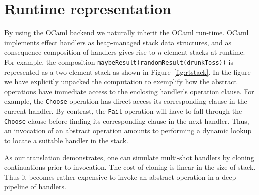 \documentclass[12pt,mscres,cdtppar,twoside,openright,logo,rightchapter,normalheadings]{infthesis}
\theoremstyle{definition}
\begin{document}
\section{Runtime representation}
\label{sec:representation}
By using the OCaml backend we naturally inherit the OCaml
run-time. OCaml implements effect handlers as heap-managed stack data
structures, and as consequence composition of handlers gives rise to
$n$-element stacks at runtime. For example, the composition
\lstinline[mathescape]!maybeResult(randomResult(drunkToss))! is
represented as a two-element stack as shown in
Figure~\ref{fig:rtstack}. In the figure we have explicitly unpacked
the computation to exemplify how the abstract operations have
immediate access to the enclosing handler's operation clause. For
example, the \lstinline$Choose$ operation has direct access its
corresponding clause in the current handler. By contrast, the
\lstinline$Fail$ operation will have to fall-through the
\lstinline$Choose$-clause before finding its corresponding clause in
the next handler. Thus, an invocation of an abstract operation amounts
to performing a dynamic lookup to locate a suitable handler in the
stack.

As our translation demonstrates, one can simulate multi-shot handlers
by cloning continuations prior to invocation. The cost of cloning is
linear in the size of stack. Thus it becomes rather expensive to
invoke an abstract operation in a deep pipeline of handlers.


\end{document}
